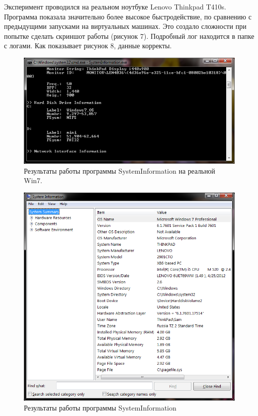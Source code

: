 \documentclass[a4paper, 12pt]{report}		%
\begin{document}
Эксперимент проводился на реальном ноутбуке Lenovo Thinkpad T410s. Программа показала значительно более высокое быстродействие, по сравнению с предыдущими запусками на виртуальных машинах. Это создало сложности при попытке сделать скриншот работы (рисунок 7). Подробный лог находится в папке с логами. Как показывает рисунок 8, данные корректы.

\begin{figure}[h!]
\centering
\includegraphics[scale=0.75]{res/result2}
\caption{Результаты работы программы SystemInformation на реальной Win7.}
\end{figure}

\begin{figure}[h!]
\centering
\includegraphics[scale=0.75]{res/msinfo322}
\caption{Результаты работы программы SystemInformation}
\end{figure}
\end{document}
